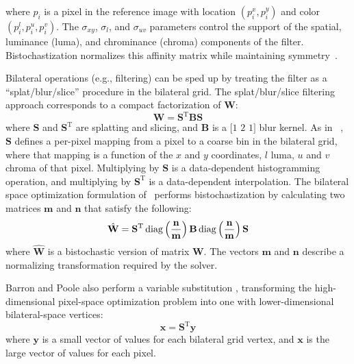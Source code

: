 where $p_i$ is a pixel in the reference image with location $(p^x_i, p^y_i)$ and color $(p^l_i, p^u_i, p^v_i)$.
The $\sigma_{xy}$, $\sigma_{l}$, and $\sigma_{uv}$ parameters control the support of the spatial, luminance (luma), and chrominance (chroma) components of the filter.
Bistochastization normalizes this affinity matrix while maintaining symmetry~\cite{Barron2015A}.

Bilateral operations (e.g., filtering) can be sped up by treating the filter as a ``splat/blur/slice'' procedure in the bilateral grid.
The splat/blur/slice filtering approach corresponds to a compact factorization of $\mathbf{W}$:
\begin{equation}
\mathbf{W} = \mathbf{S}^\mathrm{T} {\mathbf{B}} \mathbf{S} \label{eq:factorization}
\end{equation}
where $\mathbf{S}$ and $\mathbf{S}^\mathrm{T}$ are splatting and slicing, and $\mathbf{B}$ is a $[1$ $2$ $1]$ blur kernel. As in ~\cite{BarronPoole2016},
$\mathbf{S}$ defines a per-pixel mapping from a pixel to a coarse bin in the bilateral grid, where that mapping is a function of the $x$ and $y$ coordinates, $l$ luma, $u$ and $v$ chroma of that pixel.
Multiplying by $\mathbf{S}$ is a data-dependent histogramming operation, and multiplying by $\mathbf{S}^\mathrm{T}$ is a data-dependent interpolation.
The bilateral space optimization formulation of~\cite{Barron2015A} performs bistochastization by calculating two matrices $\mathbf{m}$ and $\mathbf{n}$ that satisfy the following:
\begin{equation}
\hat{\mathbf{W}} = \mathbf{S}^\mathrm{T} \operatorname{diag}\left( \mathbf{n} \over \mathbf{m} \right) \mathbf{B} \operatorname{diag}\left( \mathbf{n} \over \mathbf{m} \right) \mathbf{S} \label{eq:equiv}
\end{equation}
where $\hat{\mathbf{W}}$ is a bistochastic version of matrix $\mathbf{W}$.
The vectors $\mathbf{m}$ and $\mathbf{n}$ describe a normalizing transformation required by the solver.

Barron and Poole also perform a variable substitution \cite{BarronPoole2016}, transforming the high-dimensional pixel-space optimization problem into one with lower-dimensional bilateral-space vertices:
\begin{equation}
\mathbf{x} = \mathbf{S}^\mathrm{T} \mathbf{y} \label{eq:substitution}
\end{equation}
where $\mathbf{y}$ is a small vector of values for each bilateral grid vertex, and $\mathbf{x}$ is the large vector of values for each pixel.

